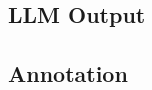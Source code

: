\documentclass{article}
\begin{document}



\subsection{LLM Output}\label{sec:llm_output}





\subsection{Annotation}\label{sec:annotation}

\end{document}

